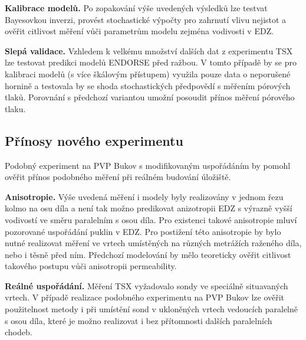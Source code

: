 \documentclass{article}
\begin{document}
{\bf Kalibrace modelů.} Po zopakování výše uvedených výsledků lze testvat Bayesovkou inverzi, provést
stochastické výpočty pro zahrnutí vlivu nejistot a ověřit citlivost měření vůči 
parametrům modelu zejména vodivosti v EDZ. 

{\bf Slepá validace.} Vzhledem k velkému množství dalších dat z experimentu TSX lze testovat predikci modelů ENDORSE před ražbou.
V tomto případě by se pro kalibraci modelů (s více škálovým přístupem) využila pouze data o neporušené hornině a 
testovala by se shoda stochastických předpovědí s měřením pórových tlaků. Porovnání s předchozí variantou umožní posoudit 
přínos měření pórového tlaku.


\subsection{Přínosy nového experimentu}
Podobný experiment na PVP Bukov s modifikovaným uspořádáním by pomohl ověřit přínos podobného měření při reálném budování úložiště.

{\bf Anisotropie.} Výše uvedená měření i modely byly realizovány v jednom řezu kolmo na osu díla a není tak možno predikovat anizotropii EDZ s výrazně vyšší vodivostí ve směru paralelním s osou díla. Pro existenci takové anisotropie mluví pozorované uspořádání puklin v EDZ. Pro postižení této anisotropie by bylo nutné realizovat měření ve vrtech umístěných na různých metrážích raženého díla, nebo i těsně před ním. Předchozí modelování by mělo teoreticky ověřit citlivost takového postupu vůči anisotropii permeability.

{\bf Reálné uspořádání.} Měření TSX vyžadovalo sondy ve speciálně situavaných vrtech. V případě realizace podobného experimentu na PVP Bukov lze ověřit
 použitelnost metody i při umístění sond v ukloněných vrtech vedoucích paralelně s osou díla, které je možno realizovat i bez přítomnosti dalších paralelních chodeb. 











\pagebreak





\end{document}
